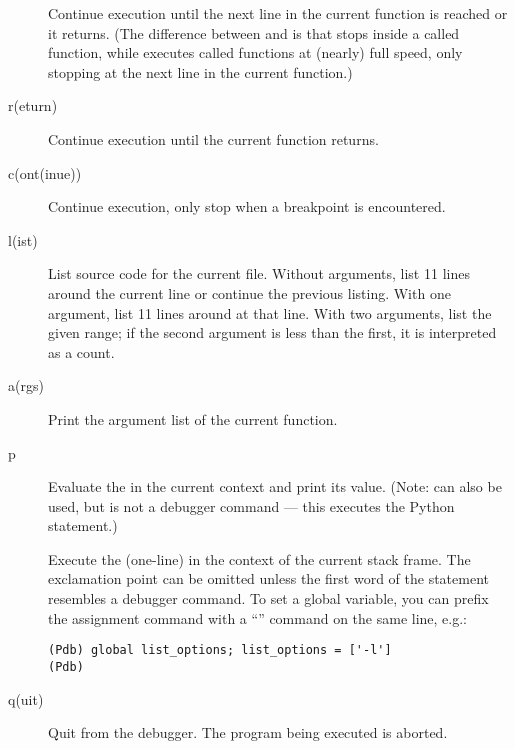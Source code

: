 \begin{description}
Continue execution until the next line in the current function
is reached or it returns.  (The difference between  and
 is that  stops inside a called function, while
 executes called functions at (nearly) full speed, only
stopping at the next line in the current function.)

\item[r(eturn)]

Continue execution until the current function returns.

\item[c(ont(inue))]

Continue execution, only stop when a breakpoint is encountered.

\item[l(ist) \optional{\var{first\optional{, last}}}]

List source code for the current file.  Without arguments, list 11
lines around the current line or continue the previous listing.  With
one argument, list 11 lines around at that line.  With two arguments,
list the given range; if the second argument is less than the first,
it is interpreted as a count.

\item[a(rgs)]

Print the argument list of the current function.

\item[p \var{expression}]

Evaluate the  in the current context and print its
value.  (Note:  can also be used, but is not a debugger
command --- this executes the Python  statement.)

\item[\optional{!}\var{statement}]

Execute the (one-line)  in the context of
the current stack frame.
The exclamation point can be omitted unless the first word
of the statement resembles a debugger command.
To set a global variable, you can prefix the assignment
command with a ``'' command on the same line, e.g.:

\begin{verbatim}
(Pdb) global list_options; list_options = ['-l']
(Pdb)
\end{verbatim}

\item[q(uit)]

Quit from the debugger.
The program being executed is aborted.

\end{description}

